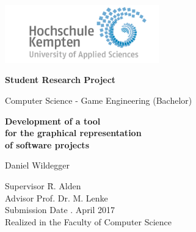 \thispagestyle{empty}



\vspace*{-20mm}
\begin{flushright}
\includegraphics[width=0.5\textwidth]{Bilder/LogoHS.png}
\end{flushright}


\vspace*{2cm}

\begin{center}
{\Large \textbf{Student Research Project}}\\ 

\vspace*{1cm}

{\large Computer Science - Game Engineering (Bachelor)\\[1mm]}

\vspace{1cm}

{\Large \bfseries Development of a tool \\
				  for the graphical representation \\
				  of software projects \\}


\vspace{1.5cm}

{\large Daniel Wildegger}\\[40mm]

\end{center}

\vfill

\parbox{120mm}{
\begin{tabbing}
Supervisor \hspace{1.2cm}    \= R. Alden\\
Advisor						\> Prof. Dr. M. Lenke\\
Submission Date             . April 2017\\
Realized in the             \> Faculty of Computer Science\\[4mm]
\end{tabbing}
}

